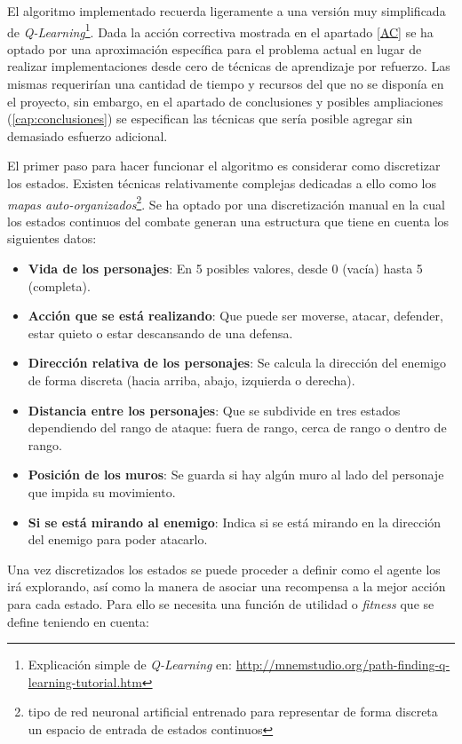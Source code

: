 El algoritmo implementado recuerda ligeramente a una versión muy simplificada de \textit{Q-Learning}\footnote{Explicación simple de \textit{Q-Learning} en: \url{http://mnemstudio.org/path-finding-q-learning-tutorial.htm}}. Dada la acción correctiva mostrada en el apartado \ref{AC} se ha optado por una aproximación específica para el problema actual en lugar de realizar implementaciones desde cero de técnicas de aprendizaje por refuerzo. Las mismas requerirían una cantidad de tiempo y recursos del que no se disponía en el proyecto, sin embargo, en el apartado de conclusiones y posibles ampliaciones (\ref{cap:conclusiones}) se especifican las técnicas que sería posible agregar sin demasiado esfuerzo adicional.

\bigskip

El primer paso para hacer funcionar el algoritmo es considerar como discretizar los estados. Existen técnicas relativamente complejas dedicadas a ello como los \textit{mapas auto-organizados}\footnote{tipo de red neuronal artificial entrenado para representar de forma discreta un espacio de entrada de estados continuos}. Se ha optado por una discretización manual en la cual los estados continuos del combate generan una estructura que tiene en cuenta los siguientes datos:

\begin{itemize}
	\item \textbf{Vida de los personajes}: En 5 posibles valores, desde 0 (vacía) hasta 5 (completa).
	\item \textbf{Acción que se está realizando}: Que puede ser moverse, atacar, defender, estar quieto o estar descansando de una defensa.
	\item \textbf{Dirección relativa de los personajes}: Se calcula la dirección del enemigo de forma discreta (hacia arriba, abajo, izquierda o derecha).
	\item \textbf{Distancia entre los personajes}: Que se subdivide en tres estados dependiendo del rango de ataque: fuera de rango, cerca de rango o dentro de rango.
	\item \textbf{Posición de los muros}: Se guarda si hay algún muro al lado del personaje que impida su movimiento.
	\item \textbf{Si se está mirando al enemigo}: Indica si se está mirando en la dirección del enemigo para poder atacarlo.
\end{itemize}

Una vez discretizados los estados se puede proceder a definir como el agente los irá explorando, así como la manera de asociar una recompensa a la mejor acción para cada estado. Para ello se necesita una función de utilidad o \textit{fitness} que se define teniendo en cuenta:


